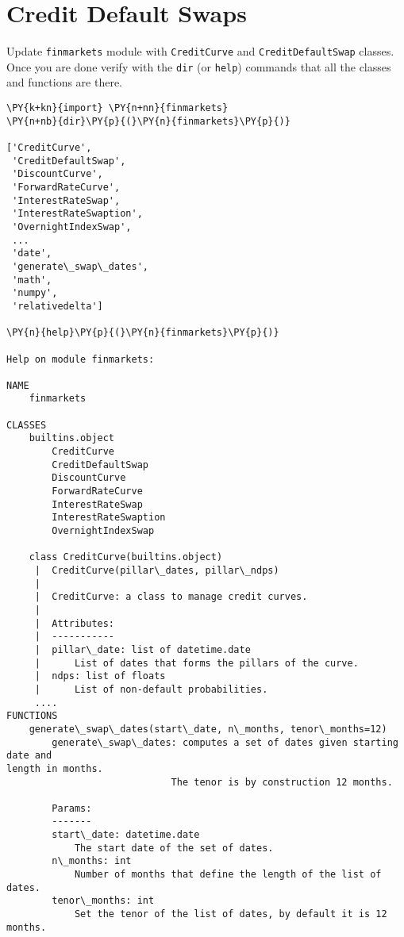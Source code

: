 \chapter{Credit Default Swaps}\label{introduction-to-python---lesson-10}

\begin{Exercise}
Update \texttt{finmarkets} module with \texttt{CreditCurve} and \texttt{CreditDefaultSwap} classes. Once you are done verify with the \texttt{dir} (or \texttt{help}) commands that all the classes and functions are there.
\end{Exercise}

\begin{Answer}
  \begin{tcolorbox}[breakable, size=fbox, boxrule=1pt, pad at break*=1mm,colback=cellbackground, colframe=cellborder]
\begin{Verbatim}[commandchars=\\\{\}]
\PY{k+kn}{import} \PY{n+nn}{finmarkets}
\PY{n+nb}{dir}\PY{p}{(}\PY{n}{finmarkets}\PY{p}{)}

['CreditCurve',
 'CreditDefaultSwap',
 'DiscountCurve',
 'ForwardRateCurve',
 'InterestRateSwap',
 'InterestRateSwaption',
 'OvernightIndexSwap',
 ...
 'date',
 'generate\_swap\_dates',
 'math',
 'numpy',
 'relativedelta']

\PY{n}{help}\PY{p}{(}\PY{n}{finmarkets}\PY{p}{)}

Help on module finmarkets:

NAME
    finmarkets

CLASSES
    builtins.object
        CreditCurve
        CreditDefaultSwap
        DiscountCurve
        ForwardRateCurve
        InterestRateSwap
        InterestRateSwaption
        OvernightIndexSwap

    class CreditCurve(builtins.object)
     |  CreditCurve(pillar\_dates, pillar\_ndps)
     |
     |  CreditCurve: a class to manage credit curves.
     |
     |  Attributes:
     |  -----------
     |  pillar\_date: list of datetime.date
     |      List of dates that forms the pillars of the curve.
     |  ndps: list of floats
     |      List of non-default probabilities.
     ....
FUNCTIONS
    generate\_swap\_dates(start\_date, n\_months, tenor\_months=12)
        generate\_swap\_dates: computes a set of dates given starting date and
length in months.
                             The tenor is by construction 12 months.

        Params:
        -------
        start\_date: datetime.date
            The start date of the set of dates.
        n\_months: int
            Number of months that define the length of the list of dates.
        tenor\_months: int
            Set the tenor of the list of dates, by default it is 12 months.
\end{Verbatim}
\end{tcolorbox}
\end{Answer}

